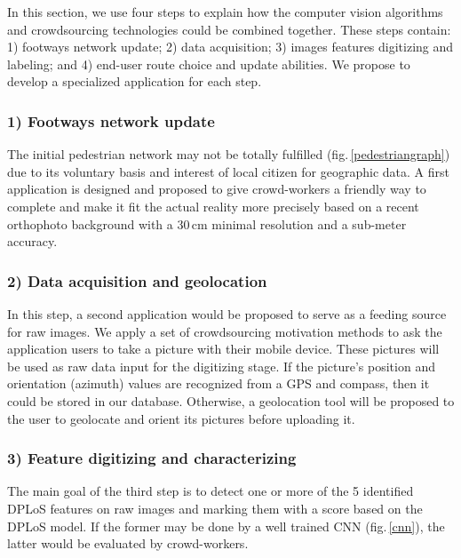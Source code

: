 \documentclass[10pt,conference,a4paper]{IEEEtran}
\begin{document}
In this section, we use four steps to explain how the computer vision algorithms and crowdsourcing technologies could be combined together. These steps contain: 1) footways network update; 2) data acquisition; 3) images features digitizing and labeling; and 4) end-user route choice and update abilities. We propose to develop a specialized application for each step.


\subsubsection*{1) Footways network update}
The initial pedestrian network may not be totally fulfilled (fig.\,\ref{pedestriangraph}) due to its voluntary basis and interest of local citizen for geographic data. A first application is designed and proposed to give crowd-workers a friendly way to complete and make it fit the actual reality more precisely based on a recent orthophoto background with a 30\,cm minimal resolution and a sub-meter accuracy. %


\subsubsection*{2) Data acquisition and geolocation}
In this step, a second application would be proposed to serve as a feeding source for raw images. We apply a set of crowdsourcing motivation methods \cite{liu2018} to ask the application users to  take a picture with their mobile device. These pictures will be used as raw data input for the digitizing stage.
If the picture's position and orientation (azimuth) values are recognized from a GPS and compass, then it could be stored in our database. Otherwise, a geolocation tool will be proposed to the user to geolocate and orient its pictures before uploading it. %



\subsubsection*{3) Feature digitizing and characterizing}
The main goal of the third step %
is to detect one or more of the 5 identified DPLoS features on raw images and marking them with a score based on the DPLoS model. If the former may be done by a well trained CNN (fig.\,\ref{cnn}), the latter would be evaluated by crowd-workers.
\end{document}
